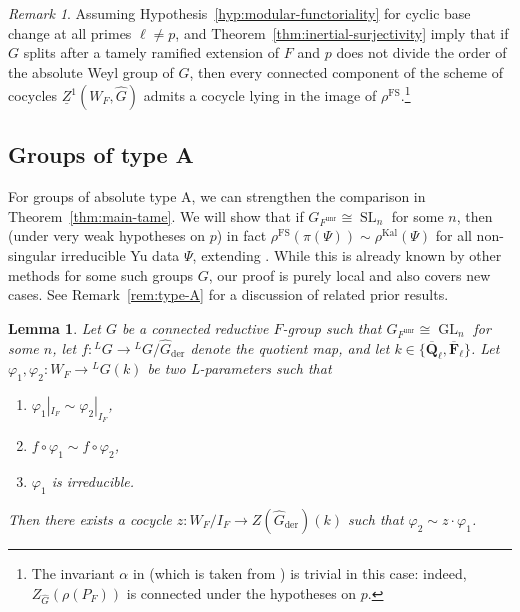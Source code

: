 \documentclass[reqno]{amsart}
\numberwithin{equation}{subsection}
\newcommand{\F}{\mathbf{F}}
\newcommand{\Q}{\mathbf{Q}}
\newcommand{\ol}[1]{\overline{#1}}
\newcommand{\wh}[1]{\widehat{#1}}
\newcommand{\co}{\colon}
\newcommand{\ld}{{}^L}
\DeclareMathOperator{\GL}{GL}
\DeclareMathOperator{\SL}{SL}
\DeclareMathOperator{\unr}{unr}
\DeclareMathOperator{\FS}{FS}
\DeclareMathOperator{\Kal}{Kal}
\DeclareMathOperator{\der}{der}
\newtheorem{lemma}[thm]{Lemma}
\theoremstyle{remark}
\newtheorem{remark}[thm]{Remark}
\numberwithin{equation}{subsection}
\numberwithin{figure}{subsection}
\begin{document}
\begin{remark}
    Assuming Hypothesis~\ref{hyp:modular-functoriality} for cyclic base change at all primes $\ell \neq p$, \cite[Theorem 1.2]{Cot24b} and Theorem~\ref{thm:inertial-surjectivity} imply that if $G$ splits after a tamely ramified extension of $F$ and $p$ does not divide the order of the absolute Weyl group of $G$, then every connected component of the scheme of cocycles $\underline{Z}^1(W_F, \wh G)$ admits a cocycle lying in the image of $\rho^{\FS}$.\footnote{The invariant $\alpha$ in \cite[Theorem 1.2]{Cot24b} (which is taken from \cite[\S 4]{DHKM25}) is trivial in this case: indeed, $Z_{\wh G}(\rho(P_F))$ is connected under the hypotheses on $p$.}
\end{remark}












\subsection{Groups of type A}

For groups of absolute type A, we can strengthen the comparison in Theorem~\ref{thm:main-tame}. We will show that if $G_{F^{\unr}} \cong \SL_n$ for some $n$, then (under very weak hypotheses on $p$) in fact $\rho^{\FS}(\pi(\Psi)) \sim \rho^{\Kal}(\Psi)$ for all non-singular irreducible Yu data $\Psi$, extending \cite[Example~10.2.3]{CF26a}. While this is already known by other methods for some such groups $G$, our proof is purely local and also covers new cases. See Remark~\ref{rem:type-A} for a discussion of related prior results.

\begin{lemma}\label{lemma:l-parameters-for-gln}
Let $G$ be a connected reductive $F$-group such that $G_{F^{\unr}} \cong \GL_n$ for some $n$, let $f\co \ld G \to \ld G/\wh G_{\der}$ denote the quotient map, and let $k \in \{\ol\Q_\ell, \ol\F_\ell\}$. Let $\varphi_1, \varphi_2\co W_F \to \ld G(k)$ be two L-parameters such that
\begin{enumerate}
    \item $\varphi_1|_{I_F} \sim \varphi_2|_{I_F}$,
    \item $f \circ \varphi_1 \sim f \circ \varphi_2$,
    \item $\varphi_1$ is irreducible.
\end{enumerate}
Then there exists a cocycle $z\co W_F/I_F \to Z(\wh G_{\der})(k)$ such that $\varphi_2 \sim z\cdot\varphi_1$.
\end{lemma}
\end{document}
